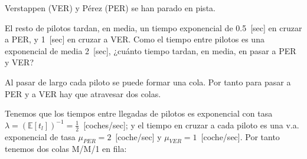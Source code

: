 \documentclass{upmassignment}
\begin{document}
\begin{problemlist}
\begin{solucion}
    \end{solucion}


    \pbitem Verstappen (VER)
    y Pérez (PER) se han parado en pista.

    \vspace{1em}
    \vspace{1em}

    El resto de pilotos 
    tardan, en media, un tiempo exponencial de
    0.5~[sec] en cruzar a PER, y 1~[sec] en
    cruzar a VER. Como el
    tiempo entre pilotos es una
    exponencial de media 2~[sec], ¿cuánto
    tiempo tardan, en media, en pasar a
    PER y VER?

    \begin{solucion}
        Al pasar de largo cada piloto se puede formar
una cola. Por tanto para pasar a PER y a VER
hay que atravesar dos colas.

Tenemos que los tiempos entre llegadas de
pilotos es exponencial con tasa
$\lambda=(\mathbb{E}[t_l])^{-1}
=\tfrac{1}{2}$~[coches/sec]; y el tiempo en
cruzar a cada piloto es una v.a. exponencial
de tasa $\mu_{PER}=2$~[coche/sec] y
$\mu_{VER}=1$~[coche/sec].
Por tanto tenemos dos colas M/M/1 en fila:


\usetikzlibrary{calc}

\vspace{1em}
\begin{minipage}{\textwidth}
\centering
{}
\end{minipage}
\end{solucion}
\end{problemlist}
\end{document}
